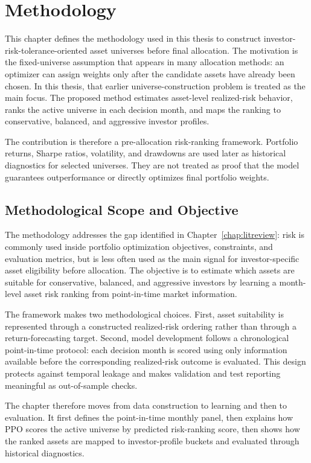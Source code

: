 \chapter{Methodology}
\label{chap:method}

This chapter defines the methodology used in this thesis to construct investor-risk-tolerance-oriented asset universes before final allocation. The motivation is the fixed-universe assumption that appears in many allocation methods: an optimizer can assign weights only after the candidate assets have already been chosen. In this thesis, that earlier universe-construction problem is treated as the main focus. The proposed method estimates asset-level realized-risk behavior, ranks the active universe in each decision month, and maps the ranking to conservative, balanced, and aggressive investor profiles.

The contribution is therefore a pre-allocation risk-ranking framework. Portfolio returns, Sharpe ratios, volatility, and drawdowns are used later as historical diagnostics for selected universes. They are not treated as proof that the model guarantees outperformance or directly optimizes final portfolio weights.

\section{Methodological Scope and Objective}
\label{sec:method_scope}

The methodology addresses the gap identified in Chapter~\ref{chap:litreview}: risk is commonly used inside portfolio optimization objectives, constraints, and evaluation metrics, but is less often used as the main signal for investor-specific asset eligibility before allocation. The objective is to estimate which assets are suitable for conservative, balanced, and aggressive investors by learning a month-level asset risk ranking from point-in-time market information.

The framework makes two methodological choices. First, asset suitability is represented through a constructed realized-risk ordering rather than through a return-forecasting target. Second, model development follows a chronological point-in-time protocol: each decision month is scored using only information available before the corresponding realized-risk outcome is evaluated. This design protects against temporal leakage and makes validation and test reporting meaningful as out-of-sample checks.

The chapter therefore moves from data construction to learning and then to evaluation. It first defines the point-in-time monthly panel, then explains how PPO scores the active universe by predicted risk-ranking score, then shows how the ranked assets are mapped to investor-profile buckets and evaluated through historical diagnostics.

